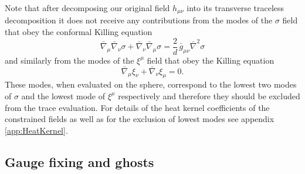\documentclass[notitlepage,eqsecnum,bm,amsmath,preprintnumbers,superscriptaddress,nofootinbib,aps,11pt]{revtex4-1}
\begin{document}
Note that after decomposing our original field $h_{\mu\nu}$ into its transverse traceless decomposition it does not receive any 
contributions from the modes of the $\sigma$ field that obey the conformal Killing equation
\begin{equation}
\bar \nabla_{\mu}\bar\nabla_{\nu}\sigma+\bar\nabla_{\nu}\bar\nabla_{\mu}\sigma=\frac{2}{d}\,\bar g_{\mu\nu} \bar\nabla^2\sigma
\end{equation}
and similarly from the modes of the $\xi^{\mu}$ field that obey the Killing equation
\begin{equation}
\bar \nabla_{\mu}\xi_{\nu}+\bar\nabla_{\nu}\xi_{\mu}=0.
\end{equation}
These modes, when evaluated on the sphere, correspond to the lowest two modes of $\sigma$ and the lowest mode of $\xi^{\mu}$ 
respectively and therefore they should be excluded from the trace evaluation. For details of the heat kernel coefficients of the 
constrained fields as well as for the exclusion of lowest modes see appendix \ref{app:HeatKernel}.



\subsection{Gauge fixing and ghosts}
\label{subsec:GaugeFixingPart}
\end{document}
